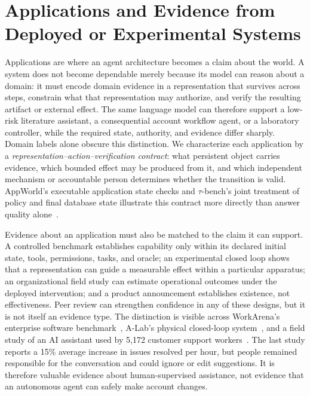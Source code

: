 \section{Applications and Evidence from Deployed or Experimental Systems}
\label{sec:applications}

Applications are where an agent architecture becomes a claim about the world. A system does not become dependable merely because its model can reason about a domain: it must encode domain evidence in a representation that survives across steps, constrain what that representation may authorize, and verify the resulting artifact or external effect. The same language model can therefore support a low-risk literature assistant, a consequential account workflow agent, or a laboratory controller, while the required state, authority, and evidence differ sharply. Domain labels alone obscure this distinction. We characterize each application by a \emph{representation--action--verification contract}: what persistent object carries evidence, which bounded effect may be produced from it, and which independent mechanism or accountable person determines whether the transition is valid. AppWorld's executable application state checks and $\tau$-bench's joint treatment of policy and final database state illustrate this contract more directly than answer quality alone~\cite{trivedi2024appworld,yao2024taubench}.

Evidence about an application must also be matched to the claim it can support. A controlled benchmark establishes capability only within its declared initial state, tools, permissions, tasks, and oracle; an experimental closed loop shows that a representation can guide a measurable effect within a particular apparatus; an organizational field study can estimate operational outcomes under the deployed intervention; and a product announcement establishes existence, not effectiveness. Peer review can strengthen confidence in any of these designs, but it is not itself an evidence type. The distinction is visible across WorkArena's enterprise software benchmark~\cite{drouin2024workarena}, A-Lab's physical closed-loop system~\cite{szymanski2023alab}, and a field study of an AI assistant used by 5,172 customer support workers~\cite{brynjolfsson2025generativeaiatwork}. The last study reports a 15\% average increase in issues resolved per hour, but people remained responsible for the conversation and could ignore or edit suggestions. It is therefore valuable evidence about human-supervised assistance, not evidence that an autonomous agent can safely make account changes.

